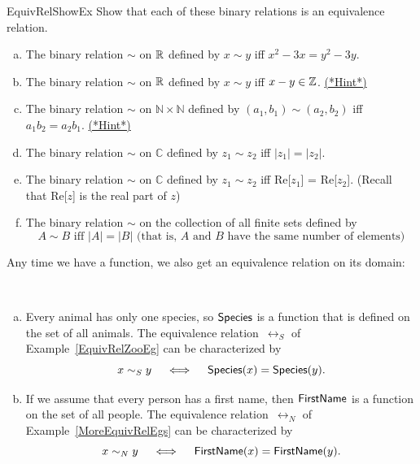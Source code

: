 \begin{exercise}{EquivRelShowEx}
Show that each of these binary relations is an equivalence relation.
\begin{enumerate}[(a)]
\item \label{EquivRelShowEx-x2min3x}
The binary relation $\sim$ on $\mathbb{R}$ defined by $x \sim y$ iff $x^2 - 3x = y^2 - 3y$.
\item \label{EquivRelShowEx-xminyinZ}
The binary relation $\sim$ on $\mathbb{R}$ defined by $x \sim y$ iff $x - y \in \mathbb{Z}$.
\hyperref[secEqRelChapHints]{(*Hint*)}
\item \label{EquivRelShowEx-ab=ab}
The binary relation $\sim$ on $\mathbb{N} \times \mathbb{N}$ defined by $(a_1,b_1) \sim (a_2,b_2)$ iff $a_1 b_2 = a_2 b_1$.
\hyperref[secEqRelChapHints]{(*Hint*)}
\item \label{EquivRelComplex1}
The binary relation $\sim$ on $\mathbb{C}$ defined by $z_1 \sim z_2$ iff $|z_1|=|z_2|$.
\item \label{EquivRelComplex1}
The binary relation $\sim$ on $\mathbb{C}$  defined by $z_1 \sim z_2$ iff Re[$z_1$] = Re[$z_2$].  (Recall that Re[$z$] is the real part of $z$)
\item
The binary relation $\sim$ on the collection of all finite sets defined by
\[  A \sim B  \text{ iff } |A|=|B|  \text{  (that is, }A \text{ and } B \text{ have the same number of elements)} \]
\end{enumerate}
\end{exercise}


Any time we have a function, we also get an equivalence relation on its domain:

\begin{eg} \ 
\begin{enumerate}[(a)]
\item Every animal has only one species, so $\sf{Species}$ is a function that is defined on the set of all animals. The equivalence relation~$\rel_S$ of Example~\ref{EquivRelZooEg} can be characterized by
\[ x \sim_S y \quad \iff \quad {\sf{S}pecies}(x) = {\sf{S}pecies}(y) .\]
\item If we assume that every person has a first name, then $\sf{FirstName}$ is a function on the set of all people. The equivalence relation~$\rel_N$ of Example~\ref{MoreEquivRelEgs} can be characterized by
\[  x \sim_N y \quad \iff \quad {\sf{F}irstName}(x) = {\sf{F}irstName}(y) .\]
\end{enumerate}
\end{eg}


